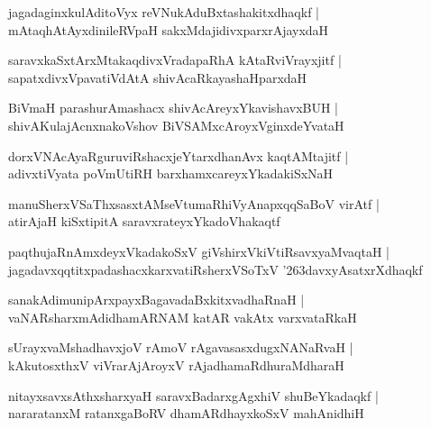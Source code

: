 \documentclass[twoside,12pt,openright]{book}
\def\S{\char'263}
\newcounter{shloka}[chapter]
\begin{document}
\begin{shloka}%
jagadaginxkulAditoVyx reVNukAduBxtashakitxdhaqkf |\\
mAtaqhAtAyxdinileRVpaH sakxMdajidivxparxrAjayxdaH 
\end{shloka}

\begin{shloka}%
saravxkaSxtArxMtakaqdivxVradapaRhA kAtaRviVrayxjitf |\\
sapatxdivxVpavatiVdAtA shivAcaRkayashaHparxdaH 
\end{shloka}

\begin{shloka}%
BiVmaH parashurAmashacx shivAcAreyxYkavishavxBUH |\\
shivAKulajAcnxnakoVshov BiVSAMxcAroyxVginxdeYvataH 
\end{shloka}

\begin{shloka}%
dorxVNAcAyaRguruviRshacxjeYtarxdhanAvx kaqtAMtajitf |\\
adivxtiVyata poVmUtiRH barxhamxcareyxYkadakiSxNaH 
\end{shloka}

\begin{shloka}%
manuSherxVSaThxsasxtAMseVtumaRhiVyAnapxqqSaBoV virAtf |\\
atirAjaH kiSxtipitA saravxrateyxYkadoVhakaqtf 
\end{shloka}

\begin{shloka}%
paqthujaRnAmxdeyxVkadakoSxV giVshirxVkiVtiRsavxyaMvaqtaH |\\
jagadavxqqtitxpadashacxkarxvatiRsherxVSoTxV \S davxyAsatxrXdhaqkf 
\end{shloka}

\begin{shloka}%
sanakAdimunipArxpayxBagavadaBxkitxvadhaRnaH |\\
vaNARsharxmAdidhamARNAM katAR vakAtx varxvataRkaH 
\end{shloka}

\begin{shloka}%
sUrayxvaMshadhavxjoV rAmoV rAgavasasxdugxNANaRvaH |\\
kAkutosxthxV viVrarAjAroyxV rAjadhamaRdhuraMdharaH 
\end{shloka}

\begin{shloka}%
nitayxsavxsAthxsharxyaH saravxBadarxgAgxhiV shuBeYkadaqkf |\\
nararatanxM ratanxgaBoRV dhamARdhayxkoSxV mahAnidhiH 
\end{shloka}
\end{document}
